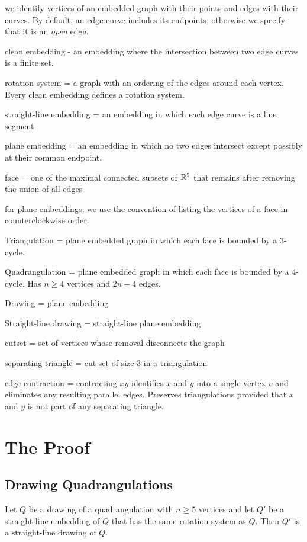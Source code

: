 \documentclass{patmorin}
\begin{document}
we identify vertices of an embedded graph with their points and edges with their curves. By default, an edge curve includes its endpoints, otherwise we specify that it is an \emph{open} edge.

clean embedding - an embedding where the intersection between two edge curves is a finite set.  

rotation system = a graph with an ordering of the edges around each vertex. Every clean embedding defines a rotation system.

straight-line embedding = an embedding in which each edge curve is a line segment

plane embedding = an embedding in which no two edges intersect except possibly at their common endpoint.

face = one of the maximal connected subsets of $\mathbb{R}^2$ that remains after removing the union of all edges

for plane embeddings, we use the convention of listing the vertices of a face in counterclockwise order.

Triangulation = plane embedded graph in which each face is bounded by a 3-cycle.

Quadrangulation = plane embedded graph in which each face is bounded by a 4-cycle. Has $n\ge 4$ vertices and $2n-4$ edges.

Drawing = plane embedding 

Straight-line drawing = straight-line plane embedding

cutset = set of vertices whose removal disconnects the graph

separating triangle = cut set of size 3 in a triangulation

edge contraction = contracting $xy$ identifies $x$ and $y$ into a single vertex $v$ and eliminates any resulting parallel edges.  Preserves triangulations provided that $x$ and $y$ is not part of any separating triangle.


\section{The Proof}

\subsection{Drawing Quadrangulations}

\begin{lem}
   Let $Q$ be a drawing of a quadrangulation with $n\ge 5$ vertices
   and let $Q'$ be a straight-line embedding of $Q$ that has the same
   rotation system as $Q$.  Then $Q'$ is a straight-line drawing of $Q$.
\end{lem}
\end{document}
